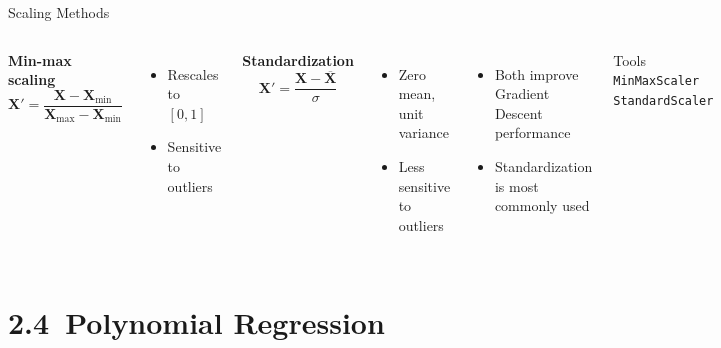 \documentclass[aspectratio=169]{beamer}
\begin{document}
\begin{frame}{Scaling Methods}
	\begin{columns}
		
		
		\textbf{Min-max scaling}
		\[
		\mathbf{X}' =
		\frac{\mathbf{X} - \mathbf{X}_{\min}}
		{\mathbf{X}_{\max} - \mathbf{X}_{\min}}
		\]
		
		\begin{itemize}
			\item Rescales to $[0,1]$
			\item Sensitive to outliers
		\end{itemize}
		
		\vspace{0.5em}
		
		\textbf{Standardization}
		\[
		\mathbf{X}' =
		\frac{\mathbf{X} - \overline{\mathbf{X}}}{\sigma}
		\]
		
		\begin{itemize}
			\item Zero mean, unit variance
			\item Less sensitive to outliers
		\end{itemize}
		
		
		\begin{itemize}
			\item Both improve Gradient Descent performance
			\item Standardization is most commonly used
		\end{itemize}
		
		\vspace{0.5em}
		
		\begin{exampleblock}{Tools}
			\texttt{MinMaxScaler} \\
			\texttt{StandardScaler}
		\end{exampleblock}
		
	\end{columns}
\end{frame}


\section{2.4~Polynomial Regression}
\end{document}
